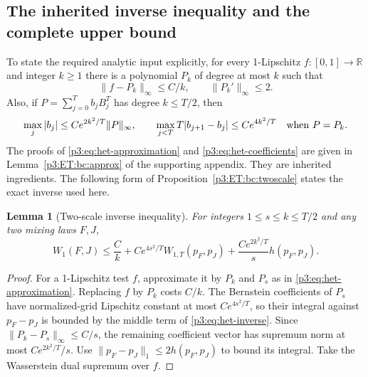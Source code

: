 \documentclass[11pt,a4paper]{article}
\newtheorem{lemma}[theorem]{Lemma}
\theoremstyle{definition}
\theoremstyle{remark}
\numberwithin{equation}{section}
\begin{document}
\subsection{The inherited inverse inequality and the complete upper bound}

To state the required analytic input explicitly, for every 1-Lipschitz
$f:[0,1]\to\mathbb R$ and integer $k\ge1$ there is a polynomial $P_k$
of degree at most $k$ such that
\begin{equation}\label{p3:eq:het-approximation}
 \|f-P_k\|_\infty\le C/k,\qquad \|P_k'\|_\infty\le2.
\end{equation}
Also, if $P=\sum_{j=0}^Tb_jB_j^T$ has degree $k\le T/2$, then
\begin{equation}\label{p3:eq:het-coefficients}
 \max_j|b_j|\le Ce^{2k^2/T}\|P\|_\infty,
 \qquad
 \max_{j<T}T|b_{j+1}-b_j|\le Ce^{4k^2/T}
 \quad\hbox{when }P=P_k.
\end{equation}
The proofs of \eqref{p3:eq:het-approximation} and
\eqref{p3:eq:het-coefficients} are given in Lemma~\ref{p3:ET:bc:approx} of the
supporting appendix.  They are inherited ingredients.  The following
form of Proposition~\ref{p3:ET:bc:twoscale} states the exact inverse used here.

\begin{lemma}[Two-scale inverse inequality]\label{p3:lem:het-inverse}
For integers $1\le s\le k\le T/2$ and any two mixing laws $F,J$,
\begin{equation}\label{p3:eq:het-inverse}
 W_1(F,J)\le\frac Ck
      +Ce^{4s^2/T}W_{1,T}(p_F,p_J)
      +\frac{Ce^{2k^2/T}}s h(p_F,p_J).
\end{equation}
\end{lemma}
\begin{proof}
For a 1-Lipschitz test $f$, approximate it by $P_k$ and $P_s$ as in
\eqref{p3:eq:het-approximation}.  Replacing $f$ by $P_k$ costs $C/k$.
The Bernstein coefficients of $P_s$ have normalized-grid Lipschitz
constant at most $Ce^{4s^2/T}$, so their integral against $p_F-p_J$ is
bounded by the middle term of \eqref{p3:eq:het-inverse}.
Since $\|P_k-P_s\|_\infty\le C/s$, the remaining coefficient vector has
supremum norm at most $Ce^{2k^2/T}/s$.  Use
$\|p_F-p_J\|_1\le2h(p_F,p_J)$ to bound its integral.  Take the
Wasserstein dual supremum over $f$.
\end{proof}
\end{document}

